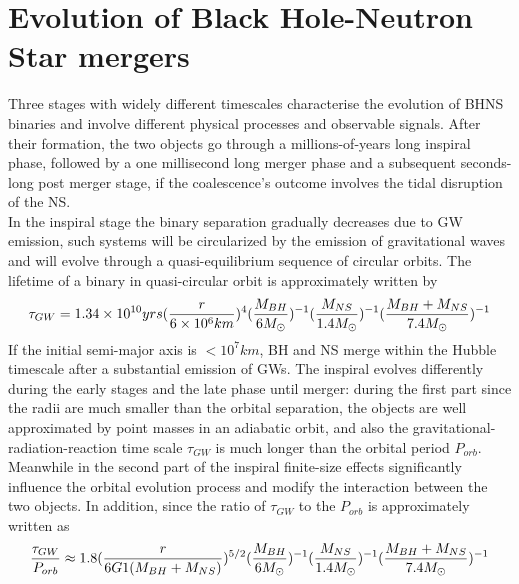 \documentclass[binding=0.6cm, LaM]{sapthesis}
\begin{document}
\section{Evolution of Black Hole-Neutron Star mergers}
        Three stages with widely different timescales characterise the evolution of BHNS binaries
        and involve different physical processes and observable signals.
        After their formation, the two objects go through a millions-of-years long inspiral phase,
        followed by a one millisecond long merger phase and a subsequent seconds-long post merger stage,
        if the coalescence’s outcome involves the tidal disruption of the NS. \\
        In the inspiral stage the binary separation gradually decreases due to GW emission,
        such systems will be circularized by the emission of gravitational waves
        and will evolve through a quasi-equilibrium sequence of circular orbits.
        The lifetime of a binary in quasi-circular orbit is approximately written by
                \begin{equation}
                        \tau_{GW} = 1.34 \times 10^{10} yrs ({{r} \over {6 \times 10^6 km}})^4 ({{M_{BH}} \over {6M_{\odot}}})^{-1} ({M_{NS} \over {1.4 M_{\odot}}})^{-1} ({{M_{BH} + M_{NS}} \over {7.4M_{\odot}}})^{-1}
                \end{equation}
        If the initial semi-major axis is $<10^7 km$, BH and NS merge within the Hubble
        timescale after a substantial emission of GWs.
        The inspiral evolves differently during the early stages and the late phase until merger:
        during the first part since the radii are much smaller than the orbital separation,
        the objects are well approximated by point masses in an adiabatic orbit,
        and also the gravitational-radiation-reaction time scale $\tau_{GW}$ is much longer than the orbital period $P_{orb}$.
        Meanwhile in the second part of the inspiral finite-size effects significantly influence the orbital evolution process
        and modify the interaction between the two objects.
        In addition, since the ratio of $\tau_{GW}$ to the $P_{orb}$ is approximately written as
                \begin{equation}
                        {{\tau_{GW}} \over {P_{orb}}} \approx 1.8 ({{r} \over {6 G 1(M_{BH}+M_{NS})}})^{5/2} ({{M_{BH}} \over {6M_{\odot}}})^{-1} ({M_{NS} \over {1.4 M_{\odot}}})^{-1} ({{M_{BH} + M_{NS}} \over {7.4M_{\odot}}})^{-1}
                \end{equation}
\end{document}
